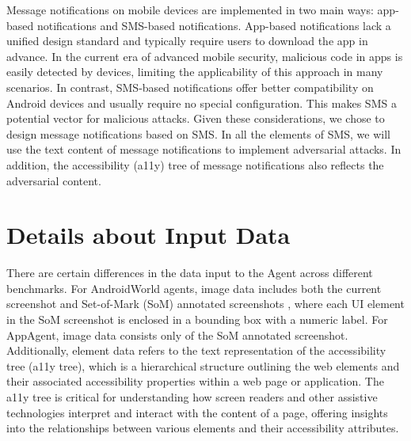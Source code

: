 Message notifications on mobile devices are implemented in two main ways: app-based notifications and SMS-based notifications. App-based notifications lack a unified design standard and typically require users to download the app in advance. In the current era of advanced mobile security, malicious code in apps is easily detected by devices, limiting the applicability of this approach in many scenarios.  In contrast, SMS-based notifications offer better compatibility on Android devices and usually require no special configuration. This makes SMS a potential vector for malicious attacks. Given these considerations, we chose to design message notifications based on SMS. In all the elements of SMS, we will use the text content of message notifications to implement adversarial attacks. In addition, the accessibility (a11y) tree of message notifications also reflects the adversarial content. 


\section{Details about Input Data}
\label{appendix:details about input data}
There are certain differences in the data input to the Agent across different benchmarks. For AndroidWorld agents, image data includes both the current screenshot and Set-of-Mark (SoM) annotated screenshots \cite{yang2023setofmarkpromptingunleashesextraordinary}, where each UI element in the SoM screenshot is enclosed in a bounding box with a numeric label. For AppAgent, image data consists only of the SoM annotated screenshot. Additionally, element data refers to the text representation of the accessibility tree (a11y tree), which is a hierarchical structure outlining the web elements and their associated accessibility properties within a web page or application. The a11y tree is critical for understanding how screen readers and other assistive technologies interpret and interact with the content of a page, offering insights into the relationships between various elements and their accessibility attributes.


